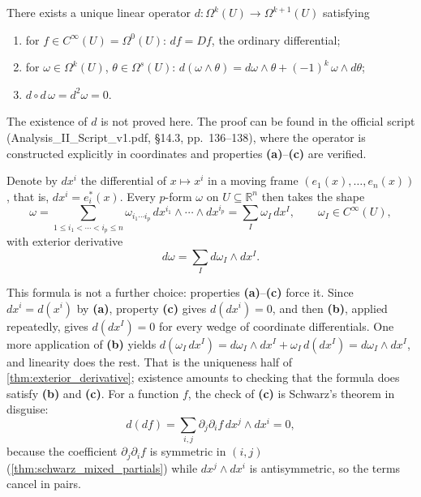 \begin{theorem}
\label{thm:exterior_derivative}
There exists a unique linear operator $d : \Omega^k(U) \to \Omega^{k+1}(U)$ satisfying
\begin{enumerate}[label=\textbf{(\alph*)}]
  \item for $f \in C^\infty(U) = \Omega^0(U)$: $df = Df$, the ordinary differential;
  \item for $\omega \in \Omega^k(U)$, $\theta \in \Omega^s(U)$: $d(\omega\wedge\theta) =
  d\omega\wedge\theta + (-1)^k\,\omega\wedge d\theta$;
  \item $d\circ d\,\omega = d^2\omega = 0$.
\end{enumerate}
\end{theorem}

\begin{ainote}
The existence of $d$ is not proved here. The proof can be found in the official script
(Analysis\_II\_Script\_v1.pdf, §14.3, pp.\ 136--138), where the operator is constructed
explicitly in coordinates and properties \textbf{(a)}--\textbf{(c)} are verified.
\end{ainote}

Denote by $dx^i$ the differential of $x \mapsto x^i$ in a moving frame $(e_1(x),\ldots,e_n(x))$,
that is, $dx^i = e_i^*(x)$. Every $p$-form $\omega$ on $U \subseteq \mathbb{R}^n$ then takes
the shape
\[\omega = \sum_{1\leq i_1<\cdots<i_p\leq n} \omega_{i_1\cdots i_p}\,dx^{i_1}\wedge\cdots\wedge
  dx^{i_p} = \sum_I \omega_I\,dx^I, \qquad \omega_I \in C^\infty(U),\]
with exterior derivative
\[d\omega = \sum_I d\omega_I \wedge dx^I.\]

This formula is not a further choice: properties \textbf{(a)}--\textbf{(c)} force it. Since
$dx^i = d(x^i)$ by \textbf{(a)}, property \textbf{(c)} gives $d(dx^i) = 0$, and then
\textbf{(b)}, applied repeatedly, gives $d(dx^I) = 0$ for every wedge of coordinate differentials.
One more application of \textbf{(b)} yields
$d(\omega_I\,dx^I) = d\omega_I\wedge dx^I + \omega_I\,d(dx^I) = d\omega_I\wedge dx^I$, and
linearity does the rest. That is the uniqueness half of \cref{thm:exterior_derivative}; existence
amounts to checking that the formula does satisfy \textbf{(b)} and \textbf{(c)}. For a function
$f$, the check of \textbf{(c)} is Schwarz's theorem in disguise:
\[d(df) = \sum_{i,j}\partial_j\partial_if\,dx^j\wedge dx^i = 0,\]
because the coefficient $\partial_j\partial_if$ is symmetric in $(i,j)$
(\cref{thm:schwarz_mixed_partials}) while $dx^j\wedge dx^i$ is antisymmetric, so the terms cancel
in pairs.

